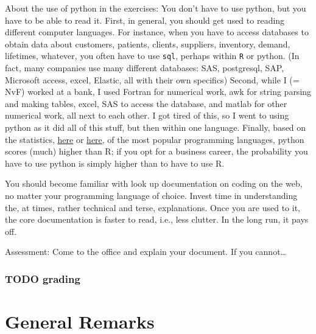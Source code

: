 \documentclass[a4paper]{article}
\theoremstyle{definition}
\newcommand{\1}[1]{\,I_{#1}} %
\begin{document}
About the use of python in the exercises: You don't have to use python, but you have to be able to read it.
First, in general, you should get used to reading different computer languages.
For instance, when you have to access databases to obtain data about customers, patients, clients, suppliers, inventory, demand, lifetimes, whatever, you often have to use \texttt{sql}, perhaps within \texttt{R} or python.
(In fact, many companies use many different databases: SAS, postgresql, SAP, Microsoft access, excel, Elastic, all with their own specifics) Second, while I (= NvF) worked at a bank, I used Fortran for numerical work, awk for string parsing and making tables, excel, SAS to access the database, and matlab for other numerical work, all next to each other.
I got tired of this, so I went to using python as it did all of this stuff, but then within one language.
Finally, based on the statistics, \href{https://www.tiobe.com/tiobe-index/}{here} or \href{https://www.northeastern.edu/graduate/blog/most-popular-programming-languages/}{here}, of the most popular programming languages, python scores (much) higher than R; if you opt for a business career, the probability you have to use python is simply higher than to have to use R.

You should become familiar with look up documentation on coding on the web, no matter your programming language of choice. Invest time in understanding the, at times, rather technical and terse, explanations.  Once you are used to it, the core documentation is faster to read, i.e., less clutter. In the long run, it pays off. 


Assessment: Come to the office and explain your document. If you cannot\ldots


\subsubsection{{\bfseries\sffamily TODO} grading}
\label{sec:org11296cf}


\section{General Remarks}
\label{sec:orgdf8229a}
\end{document}

